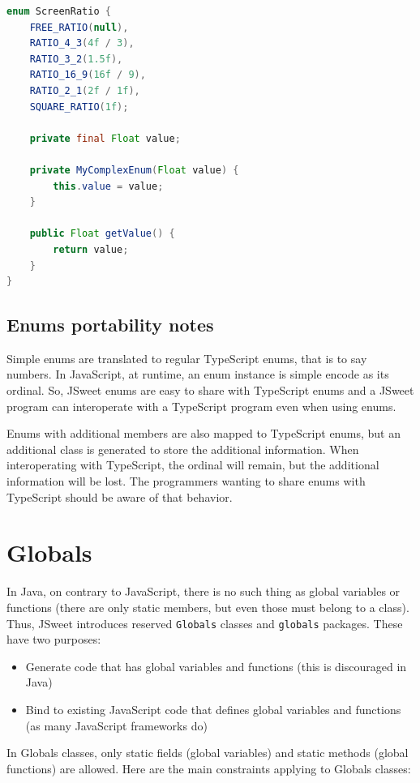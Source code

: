 \documentclass[a4paper]{report}
\begin{document}
\begin{lstlisting}[language=Java]
enum ScreenRatio {
	FREE_RATIO(null),  
	RATIO_4_3(4f / 3), 
	RATIO_3_2(1.5f), 
	RATIO_16_9(16f / 9), 
	RATIO_2_1(2f / 1f), 
	SQUARE_RATIO(1f);

	private final Float value;

	private MyComplexEnum(Float value) {
		this.value = value;
	}

	public Float getValue() {
		return value;
	}
}
\end{lstlisting}

\subsection*{Enums portability notes}

Simple enums are translated to regular TypeScript enums, that is to say numbers. In JavaScript, at runtime, an enum instance is simple encode as its ordinal. So, JSweet enums are easy to share with TypeScript enums and a JSweet program can interoperate with a TypeScript program even when using enums. 

Enums with additional members are also mapped to TypeScript enums, but an additional class is generated to store the additional information. When interoperating with TypeScript, the ordinal will remain, but the additional information will be lost. The programmers wanting to share enums with TypeScript should be aware of that behavior.

\section{Globals}

In Java, on contrary to JavaScript, there is no such thing as global variables or functions (there are only static members, but even those must belong to a class). Thus, JSweet introduces reserved \texttt{Globals} classes and \texttt{globals} packages. These have two purposes:

\begin{itemize}
\item Generate code that has global variables and functions (this is discouraged in Java)
\item Bind to existing JavaScript code that defines global variables and functions (as many JavaScript frameworks do)
\end{itemize}

In Globals classes, only static fields (global variables) and static methods (global functions) are allowed. Here are the main constraints applying to Globals classes:
\end{document}
